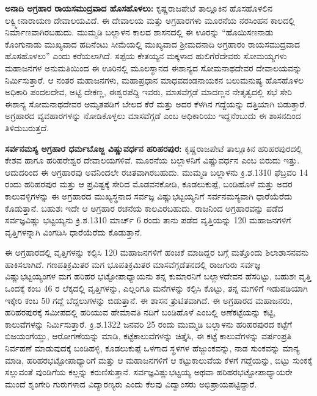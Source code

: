 \textbf{ಅನಾದಿ ಅಗ್ರಹಾರ ರಾಯಸಮುದ್ರವಾದ ಹೊಸಹೊಳಲು:} ಕೃಷ್ಣರಾಜಪೇಟೆ ತಾಲ್ಲೂಕಿನ ಹೊಸಹೊಳಲಿನ ಲಕ್ವ್ಮೀನಾರಾಯಣ ದೇವಾಲಯವಿದೆ. ಈ ದೇವಾಲಯ ಮತ್ತು ಅಗ್ರಹಾರಗಳು ಮೂರನೆಯ ನರಸಿಂಹನ ಕಾಲದಲ್ಲಿ ನಿರ್ಮಾಣವಾಗಿರಬಹುದು. ಮುಮ್ಮಡಿ ಬಲ್ಲಾಳನ ಕಾಲದ ಶಾಸನದಲ್ಲಿ ಈ ಊರನ್ನು “ಹೊಯಿಸಣನಾಡು ಕೊಂಗುನಾಡು ಮುಖ್ಯವಾದ ಹದಿನೆಂಟು ಸೀಮೆಯಲ್ಲಿ ಮುಖ್ಯವಾದ ಶ‍್ರೀಮದನಾದಿ ಅಗ್ರಹಾರಂ ರಾಯಸಮುದ್ರವಾದ ಹೊಸಹೊಳಲು” ಎಂದು ಕರೆಯಲಾಗಿದೆ. ಸಪ್ಪೆಯ ಕೇತಯ್ಯನ ಮಕ್ಕಳಾದ ಹುಲಿಗೆರೆದೇವರು ಸೋಮಯ್ಯಗಳು ಮಹಾಜನಗಳ ಅನುಮತಿಯಿಂದ ಈ ಊರಿನಲ್ಲಿ ಮೂಲಸ್ಥಾನದ ಈಶಾನ್ಯದ ಸೋಮನಾಥದೇವರ ದೇವಾಲಯವನ್ನು ನಿರ್ಮಿಸುತ್ತಾರೆ. ಆ ನಂತರ ಮಹಾಜನಗಳು, ಮಹಾಪ್ರಧಾನ ಮಾಧವದಂಡನಾಯಕನ ಬಲುಮನುಷ್ಯ ಹೊಸಹೊಳಲ ಅಧಿಕಾರಿ ಪಂದಲದೇವ, ಅಟ್ಟಿ ದೇಕಣ್ಣ, ಈಶ್ವರಪೆದ್ದಿ ಇವರು, ಮಾಸವೆಗ್ಗಡೆ ಮಾದಣ್ಣನ ನೇತೃತ್ವದಲ್ಲಿ ಸಭೆ ಸೇರಿ ಈಶಾನ್ಯ ಸೋಮನಾಥದೇವರ ಅಮೃತಪಡಿಗೆ ಬೇಲದ ಕೆರೆ ಮತ್ತು ಅದರ ಕೆಳಗಿನ ಗದ್ದೆಯನ್ನು ದತ್ತಿಯಾಗಿ ಬಿಡುತ್ತಾರೆ. ಅಗ್ರಹಾರದ ವ್ಯವಹಾರಗಳನ್ನು ನೋಡಿಕೊಳ್ಳಲು ಮಾಸವೆಗ್ಗಡೆ ಎಂಬ ಅಧಿಕಾರಿಯು ಇದ್ದನೆಂಬುದು ಈ ಶಾಸನದಿಂದ ತಿಳಿದುಬರುತ್ತದೆ.

\textbf{ಸರ್ವನಮಸ್ಯ ಅಗ್ರಹಾರ ಧರ್ಮಬೊಜ್ಜ ವಿಷ್ಣುವರ್ಧನ ಹರಿಹರಪುರ:} ಕೃಷ್ಣರಾಜಪೇಟೆ ತಾಲ್ಲೂಕಿನ ಹರಿಹರಪುರದಲ್ಲಿ ಕೇಶವ ಹಾಗೂ ಹರಿಹರೇಶ್ವರ ದೇವಾಲಯಗಳಿವೆ. ಮೂರನೆಯ ಬಲ್ಲಾಳನಿಗೆ ವಿಷ್ಣುವರ್ಧನ ಎಂಬ ಬಿರುದು ಇತ್ತು. ಆದುದರಿಂದ ಈ ಅಗ್ರಹಾರವು ಅವನಿಂದಲೇ ರಚಿತವಾಗಿರಬಹುದು. ಮುಮ್ಮಡಿ ಬಲ್ಲಾಳನು ಕ್ರಿ.ಶ.1310 ಫೆಬ್ರವರಿ 14 ರಂದು ಹರಿಹರಪುರ ಮತ್ತು ಆ ಪ್ರವಿಷ್ಟಕ್ಕೆ ಸೇರಿದ ಮೊಡವನಕೋಡಿ, ಕೂಡಲುಕುಪ್ಪೆ, ಬಂಡಿಹೊಳೆ ಮತ್ತು ಅದರ ಕಾಲುವಳ್ಳಿಗಳನ್ನು ಈ ಅಗ್ರಹಾರದ ಮುಖ್ಯಸ್ಥನಾದ ಸರ್ವಜ್ಞ ವಿಷ್ಣುಭಟ್ಟಯ್ಯನಿಗೆ ಸರ್ವನಮಸ್ಯವಾಗಿ ಧಾರೆಯೆರೆದು ಕೊಡುತ್ತಾನೆ. ಬಹುಶಃ ಇದೇ ಆ ಅಗ್ರಹಾರ ರಚನೆಯ ಕಾಲವಿರಬಹುದು. ರಾಜನಿಂದ ಅಗ್ರಹಾರವನ್ನು ಪಡೆದ ಸರ್ವಜ್ಞವಿಷ್ಣು ಭಟ್ಟಯ್ಯನು ಕ್ರಿ.ಶ.1310 ಮಾರ್ಚ್ 6 ರಂದು ತಾನು ಪಡೆದ ವೃತ್ತಿಯನ್ನು 120 ಮಹಾಜನಗಳಿಗೆ ವೃತ್ತಿಗಳನ್ನಾಗಿ ವಿಂಗಡಿಸಿ ಧಾರೆಯೆರೆದು ಕೊಡುತ್ತಾನೆ.

ಈ ಅಗ್ರಹಾರದಲ್ಲಿ ವೃತ್ತಿಗಳನ್ನು ಕಲ್ಪಿಸಿ 120 ಮಹಾಜನಗಳಿಗೆ ಹಂಚಿಕೆ ಮಾಡಿದ್ದರ ಬಗ್ಗೆ ಮತ್ತೊಂದು ಶಿಲಾಶಾಸನವನು ಹಾಕಿಸಲಾಗಿದೆ. ಗಣಪತಿಕ್ರಮಿತರ ಮಗ ಭೂಪತಿಕ್ರಮಿತರ ಮಾಸವೆಗ್ಗಡೆತನದಲ್ಲಿ ರಾಜಗುರು ಸರ್ವಜ್ಞ ವಿಷ್ಣುಭಟ್ಟಯ್ಯಂಗಳ ಮಗ ಹರಿಹರ ಭಟ್ಟೋಪಾಧ್ಯಾಯನು ತನ್ನ ಕುಮಾರನಿಗೆ ಬಲ್ಲಾಳದೇವನ ಹೆಸರಿಟ್ಟು, ಬಹುಶಃ ವೃತ್ತಿ ಒಂದಕ್ಕೆ ಕಂಬ 46 ರ ಲೆಕ್ಕದಲ್ಲಿ ವೃತ್ತಿಗಳನ್ನು, ಎಲ್ಲರಿಗೂ ಮನೆಗಳನ್ನು ಕಲ್ಪಿಸಿ ಕೊಟ್ಟು, ತನ್ನ ಮಗಳಿಗೆ ಇಡುಪಡಿಯಾಗಿ ಇಕ್ಕೇರಿ ಕಂಬ 50 ಗದ್ದೆ ಬೆದ್ದಲುಗಳನ್ನು ಬಿಡುತ್ತಾನೆ. ಈ ಶಾಸನ ತ್ರುಟಿತವಾಗಿದೆ. ಈ ಅಗ್ರಹಾರದ ಮಹಾಜನರು, ಹರಿಹರಪುರಕ್ಕೆ ಸಮೀಪದಲ್ಲಿ ಹರಿಯುವ ಹೇಮಾವತಿ ನದಿಗೆ ಬಂಡಿಹೊಳೆ ಎಂಬಲ್ಲಿ ಅಣೆಕಟ್ಟೆಯನ್ನು ಕಟ್ಟಿ, ಕಾಲುವೆಗಳನ್ನು ನಿರ್ಮಿಸುತ್ತಾರೆ. ಕ್ರಿ.ಶ.1322 ಜನವರಿ 25 ರಂದು ಮುಮ್ಮಡಿ ಬಲ್ಲಾಳನು ಹರಿಹರಪುರದ ಕಟ್ಟೆಗೆ ಬಿಜಯಂಗೆಯ್ಡು, ಆರೋಗಣೆಯನ್ನು ಮಾಡಿ, ಕಟ್ಟೆಕಾಲುವೆಗಳನ್ನು ಚಿತ್ತೈಸಿ, ಈ ಕಟ್ಟೆ ಕಾಲುವೆಗಳನ್ನು ವರ್ಷಂಪ್ರತಿ ನಿರ್ವಹಣೆ ಮಾಡುವುದಕ್ಕೆ ಬಂಡಿಹಳ್ಳಿ, ಕೂಡಲುಕುಪ್ಪೆ ಒಳಗಾದ ಸ್ಥಳಗಳ ಹೆಜ್ಜುಂಕವನ್ನು, ನಾಡ ಸುಂಕವನ್ನು ಮಾನ್ಯ ಮಾಡಿ, ಹರಿಹರಭಟ್ಟೋಪಾಧ್ಯಾರಿಗೆ ಮತ್ತು ಆ ಮಹಾಜನಗಳಿಗೆ ಆ ಕಟ್ಟುಕಾಲುವೆಯ ಕೆಳಗೆ ಗದ್ದೆಯನ್ನು, ಬಿಟ್ಟು ಸುಂಕಕ್ಕೆ ಸಲ್ಲುವಂತೆ ವುಂಡಿಗೆಯ ಕಲ್ಲನ್ನು ಕರುಣಿಸುತ್ತಾನೆ.  ಸರ್ವಜ್ಞವಿಷ್ಣುಭಟ್ಟಯ್ಯ ಅಥವಾ ಹರಿಹರಭಟ್ಟೋಪಾಧ್ಯಾಯರೇ ಮುಂದೆ ಶೃಂಗೇರಿ ಗುರುಗಳಾದ ವಿದ್ಯಾರಣ್ಯರು ಎಂದು ಕೆಲವು ವಿದ್ವಾಂಸರು ಅಭಿಪ್ರಾಯಪಟ್ಟಿದ್ದಾರೆ.

